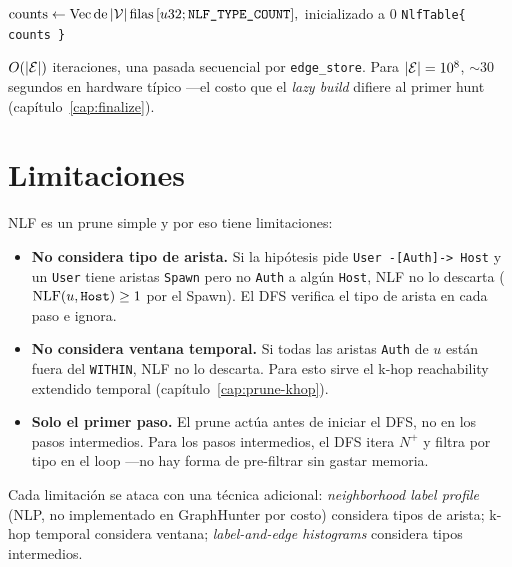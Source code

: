 \begin{algorithm}[H]
\caption{NLF build}
\(\mathrm{counts} \leftarrow \mathrm{Vec\,de\,}|\mathcal{V}|\,\mathrm{filas}\,[u32; \texttt{NLF\_TYPE\_COUNT}],\) inicializado a 0\;
\Return \texttt{NlfTable\{ counts \}}\;
\end{algorithm}

\noindent
\(O(|\mathcal{E}|)\) iteraciones, una pasada secuencial por
\texttt{edge\_store}. Para \(|\mathcal{E}| = 10^8\), \(\sim 30\) segundos en
hardware típico ---el costo que el \emph{lazy build} difiere al
primer hunt (capítulo~\ref{cap:finalize}).

\section{Limitaciones}

NLF es un prune simple y por eso tiene limitaciones:

\begin{itemize}
    \item \textbf{No considera tipo de arista.} Si la hipótesis
    pide \texttt{User -[Auth]-> Host} y un \texttt{User} tiene
    aristas \texttt{Spawn} pero no \texttt{Auth} a algún
    \texttt{Host}, NLF no lo descarta (\(\mathrm{NLF}(u, \texttt{Host}) \geq
    1\) por el Spawn). El DFS verifica el tipo de arista en cada
    paso e ignora.
    \item \textbf{No considera ventana temporal.} Si todas las
    aristas \texttt{Auth} de \(u\) están fuera del \texttt{WITHIN},
    NLF no lo descarta. Para esto sirve el k-hop reachability
    extendido temporal (capítulo~\ref{cap:prune-khop}).
    \item \textbf{Solo el primer paso.} El prune actúa antes de
    iniciar el DFS, no en los pasos intermedios. Para los pasos
    intermedios, el DFS itera \(N^{+}\) y filtra por tipo en el
    loop ---no hay forma de pre-filtrar sin gastar memoria.
\end{itemize}

\noindent
Cada limitación se ataca con una técnica adicional:
\emph{neighborhood label profile} (NLP, no implementado en
GraphHunter por costo) considera tipos de arista; k-hop temporal
considera ventana; \emph{label-and-edge histograms} considera tipos
intermedios.


